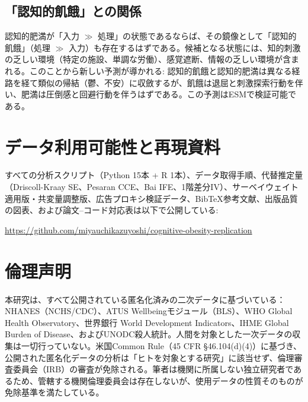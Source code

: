 \documentclass[a4paper,11pt,titlepage]{article}
\begin{document}
\subsection{「認知的飢餓」との関係}

認知的肥満が「入力 $\gg$ 処理」の状態であるならば、その鏡像として「認知的飢餓」（処理 $\gg$ 入力）も存在するはずである。候補となる状態には、知的刺激の乏しい環境（特定の施設、単調な労働）、感覚遮断、情報の乏しい環境が含まれる。このことから新しい予測が導かれる: 認知的飢餓と認知的肥満は異なる経路を経て類似の帰結（鬱、不安）に収斂するが、飢餓は退屈と刺激探索行動を伴い、肥満は圧倒感と回避行動を伴うはずである。この予測はESMで検証可能である。


\section*{データ利用可能性と再現資料}

すべての分析スクリプト（Python 15本 + R 1本）、データ取得手順、代替推定量（Driscoll-Kraay SE、Pesaran CCE、Bai IFE、1階差分IV）、サーベイウェイト適用版・共変量調整版、広告プロキシ検証データ、BibTeX参考文献、出版品質の図表、および論文--コード対応表は以下で公開している:

\url{https://github.com/miyauchikazuyoshi/cognitive-obesity-replication}


\section*{倫理声明}

本研究は、すべて公開されている匿名化済みの二次データに基づいている：NHANES（NCHS/CDC）、ATUS Wellbeingモジュール（BLS）、WHO Global Health Observatory、世界銀行 World Development Indicators、IHME Global Burden of Disease、およびUNODC殺人統計。人間を対象とした一次データの収集は一切行っていない。米国Common Rule（45 CFR \S46.104(d)(4)）に基づき、公開された匿名化データの分析は「ヒトを対象とする研究」に該当せず、倫理審査委員会（IRB）の審査が免除される。筆者は機関に所属しない独立研究者であるため、管轄する機関倫理委員会は存在しないが、使用データの性質そのものが免除基準を満たしている。
\end{document}
